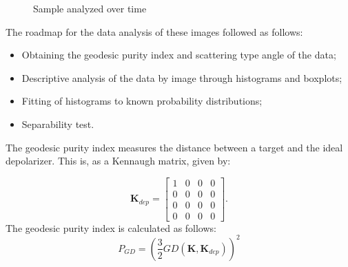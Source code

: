 \documentclass[12pt]{article}
\begin{document}
\begin{figure}[hbt]
  \centering
  \caption{Sample analyzed over time}
  \label{fig:sample_images}
\end{figure}

The roadmap for the data analysis of these images followed as follows:
\begin{itemize}
  \item Obtaining the geodesic purity index and scattering type angle of the data;
  \item Descriptive analysis of the data by image through histograms and boxplots;
  \item Fitting of histograms to known probability distributions;
  \item Separability test.
\end{itemize}

The geodesic purity index measures the distance between a target and the ideal depolarizer. This is, as a Kennaugh matrix, given by:

{
\[ \mathbf{K}_{dep} =
\begin{bmatrix}
1 & 0 & 0 & 0\\
0 & 0 & 0 & 0\\
0 & 0 & 0 & 0\\
0 & 0 & 0 & 0
\end{bmatrix}.
\]
}
The geodesic purity index is calculated as follows:
\begin{equation}
  P_{GD} = \left(\frac{3}{2}GD(\mathbf{K}, \mathbf{K}_{dep})\right)^2
\end{equation}
\end{document}
